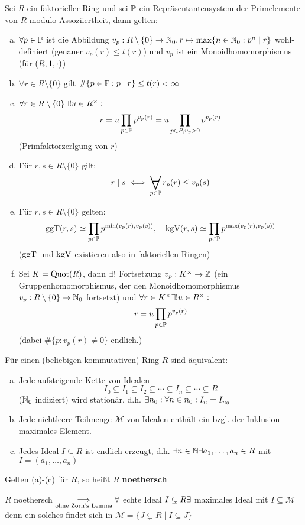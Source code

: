 \documentclass[a4paper]{report}
\begin{document}
\begin{kor}[Übung]
  Sei $R$ ein faktorieller Ring und sei $\P$ ein Repräsentantensystem der Primelemente von $R$ modulo Assoziiertheit, dann gelten:
  \begin{enumerate}[(a)]
    \item $\forall p \in \P$ ist die Abbildung $v_{p}: R \setminus \{0\} \to \Nn, r \mps \max\{n \in \Nn : p^{n} \mid r\}$ wohl-definiert (genauer $v_{p}(r) \le t(r)$) und $v_{p}$ ist ein Monoidhomomorphismus (für $(R, 1, \cd)$)
    \item $\forall r \in R \setminus \{0\}$ gilt $\#\{p \in \P : p \mid r\} \le t(r) < \infty$
    \item $\forall r \in R \setminus \{0\} \ex ! u \in R\en :$ \[r = u \prod_{p \in \P}p^{v_{p}(r)} = u\prod_{p \in P, v_{p} > 0}p^{v_{p}(r)}\] (Primfaktorzerlgung von $r$)
    \item Für $r, s \in R \setminus \{0\}$ gilt: \[r \mid s \iff \bigforall_{p \in \P} r_{p}(r) \le v_{p}(s)\]
    \item Für $r, s \in R \setminus \{0\}$ gelten:
          \[\ggt(r, s) \simeq \prod_{p \in \P}p^{\min(v_{p}(r), v_{p}(s))},\quad \kgv(r, s) \simeq \prod_{p \in \P}p^{\max(v_{p}(r), v_{p}(s))}\]
          ($\ggt$ und $\kgv$ existieren also in faktoriellen Ringen)
    \item Sei $K = \Quot(R)$, dann $\ex!$ Fortsetzung $v_{p} : K\en \to \Z$ (ein Gruppenhomomorphismus, der den Monoidhomomorphismus $v_{p} : R \setminus \{0\} \to \Nn$ fortsetzt) und $\forall r \in K\en \ex ! u \in R\en:$
          \[r = u \prod_{p \in \P}p^{v_{p}(r)}\]
          (dabei $\#\{p : v_{p}(r) \ne 0\}$ endlich.)
  \end{enumerate}
\end{kor}

\begin{ubng}[vgl. LA2] Für einen (beliebigen kommutativen) Ring $R$ sind äquivalent:
  \begin{enumerate}[(a)]
    \item Jede aufsteigende Kette von Idealen \[I_{0} \subseteq I_{1} \subseteq I_{2} \subseteq \cdots \subseteq I_{n} \subseteq \cdots \subseteq R\]
          ($\Nn$ indiziert) wird stationär, d.h. $\ex n_{0} : \forall n \in n_{0} : I_{n} = I_{n_{0}}$
    \item Jede nichtleere Teilmenge $\mathscr M$ von Idealen enthält ein bzgl. der Inklusion maximales Element.
    \item Jedes Ideal $I \subseteq R$ ist endlich erzeugt, d.h. $\ex n \in \N \ex a_{1}, \ldots, a_{n} \in R$ mit $I = (a_{1}, \ldots, a_{n})$
  \end{enumerate}
\begin{defi*}
Gelten (a)-(c) für $R$, so heißt $R$ \textbf{noethersch}
\end{defi*}
\end{ubng}
\begin{bem*} $R$ noethersch $\underset{\text{ohne Zorn's Lemma}}\imp \forall$ echte Ideal $I \subsetneq R \ex$ maximales Ideal mit $I \subseteq \mathscr M$ denn ein solches findet sich in $\mathscr M = \{J \subsetneq R \mid I \subseteq J\}$
\end{bem*}
\end{document}

